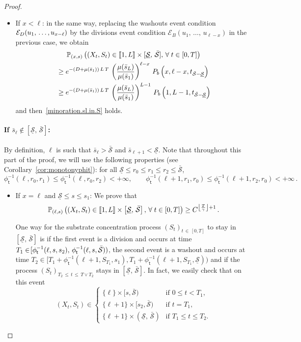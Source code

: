 \documentclass[10pt]{amsart}
\theoremstyle{definition}\newtheorem{defi}[theo]{Definition}\newtheorem{rema}[theo]{Remark}\newtheorem{exam}[theo]{Example}\newtheorem{exem}[theo]{Example}\newtheorem{nota}[theo]{Notation}
\newcommand{\llbracket}{\mathopen{[\mkern -2.7mu[}}
\newcommand{\rrbracket}{\mathclose{]\mkern -2.7mu]}}
\newcommand{\PP}{\mathbb{P}}
\newcommand{\clE}{\mathcal{E}}
\newcommand{\Smin}{\underline{\mathcal{S}}}
\newcommand{\Smax}{\bar{\mathcal{S}}}
\newcommand{\barmu}{\mu(\bar s_1)}
\newcommand{\phit}{\phi_\textsf{t}^{-1}}
\newcommand{\setunL}{\llbracket 1, L\rrbracket}
\newcommand{\1}{\mathbf{1}}
\let\oldforall\forall
\renewcommand*{\forall}{\mathrel{\oldforall}}
\begin{document}
\begin{proof}
\begin{itemize}
\item If $x < \ell$: in the same way, replacing the washouts event condition $\clE_D(u_1,\,\dots,\linebreak u_{x-\ell})$ by the divisions event condition $\clE_B(u_1,\,\dots,\,u_{\ell-x})$ in the previous case, we obtain
\begin{multline*}
 \PP_{(x,s)}
\left((X_t,S_t) \in \setunL \times [\Smin, \, \Smax], \,
\forall t\in[0,T]\right)
\\
\begin{aligned}
&\geq e^{-(D+\barmu)\,L\,T}\, \left(\frac{\mu(\bar s_L)}{\barmu}\right)^{\ell-x}
\,P_b\left(x,\ell-x, t_{\Smax-\Smin}\right)
\\
&
\geq e^{-(D+\barmu)\,L\,T}\, \left(\frac{\mu(\bar s_L)}{\barmu}\right)^{L-1}\, P_b\left(1,L-1, t_{\Smax-\Smin}\right)
\end{aligned}
\end{multline*}
and then~\eqref{minoration.sl.in.S} holds.
\end{itemize}



\paragraph{If $\bar s_\ell \notin [\Smin, \, \Smax]$:}
By definition, $\ell$ is such that $\bar s_\ell > \Smax$ and $\bar s_{\ell+1} < \Smin$. Note that throughout this part of the proof, we will use the following properties (see Corollary~\ref{cor:monotonyphit}): for all $\Smin \leq r_0 \leq r_1 \leq r_2 \leq \Smax$,
\[
\phit(\ell, r_0, r_1) \leq \phit(\ell, r_0, r_2)<+\infty, \qquad
\phit(\ell+1, r_1,r_0) \leq \phit(\ell+1,r_2,r_0)<+\infty\,.
\]
\begin{itemize}
\item If $x=\ell$ and $\Smin\leq s\leq s_1$: We prove that
\begin{align}\label{eq.p.fct.s1s2}
\PP_{(\ell,s)}
\left(\left(X_t,S_t\right) \in \setunL \times \left[\Smin, \, \Smax\right], \,
\forall t\in[0,T]\right) \geq C^{\left\lfloor\frac{T}{\gamma}\right\rfloor+1}\,.
\end{align}

One way for the substrate concentration process $(S_t)_{t\,\in\,[0,T]}$ to stay in $[\Smin, \, \Smax]$ is if the first event is a division and occurs at time $T_1 \in\! [\phit(\ell,s,s_2),\, \phit(\ell,s,\linebreak\Smax))$, the second event is a washout and occurs at time $T_2 \in [T_1+\phit(\ell+1,S_{T_1},s_1),T_1+\phit(\ell+1,S_{T_1},\Smin))$ and if the process $(S_t)_{T_2\,\leq\,t\,\leq\,T\vee T_2}$ stays in $[\Smin, \, \Smax]$. In fact, we easily check that on this event
\[
\left(X_t,S_t\right) \in
\begin{cases}
\{\ell\}\times[s,\Smax) & \text{if } 0 \leq t < T_1,\\
\{\ell+1\}\times[s_2,\Smax) & \text{if } t= T_1,\\
\{\ell+1\}\times(\Smin,\, \Smax) & \text{if } T_1 \leq t \leq T_2.
\end{cases}
\]


\end{itemize}
\end{proof}
\end{document}
